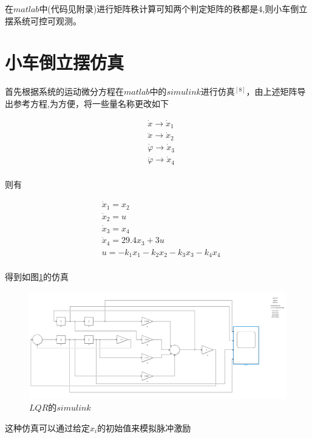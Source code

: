 在$matlab$中(代码见附录)进行矩阵秩计算可知两个判定矩阵的秩都是$4$,则小车倒立摆系统可控可观测。

\section{小车倒立摆仿真}

首先根据系统的运动微分方程在$matlab$中的$simulink$进行仿真$^{[8]}$，由上述矩阵导出参考方程,为方便，将一些量名称更改如下

\begin{equation}
\begin{aligned}
&\dot x\rightarrow \dot x_1\\
&\ddot x\rightarrow \dot x_2\\
&\dot \varphi \rightarrow \dot x_3\\
&\ddot \varphi \rightarrow \dot x_4\\
\end{aligned}
\end{equation}

则有

\begin{equation}
\begin{aligned}
&\dot x_1=x_2\\
&\dot x_2=u\\
&\dot x_3=x_4\\
&\dot x_4=29.4x_3+3u\\
&u=-k_1x_1-k_2x_2-k_3x_3-k_4x_4\\
\end{aligned}
\end{equation}

得到如图\ref{LQR_simulink}的仿真

\begin{figure}[hbpt]
\centering
\includegraphics[width=16cm]{LQR_simulink.png}
\caption{$LQR的simulink$}\label{LQR_simulink}
\end{figure}

这种仿真可以通过给定$x_i$的初始值来模拟脉冲激励

